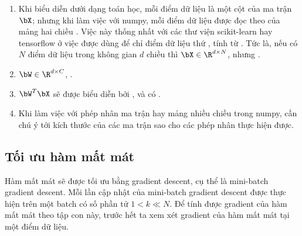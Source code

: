 \begin{mydeff}
\begin{enumerate}
\item Khi biểu diễn dưới dạng toán học, mỗi điểm dữ liệu là một cột của ma trận
$\bX$; nhưng khi làm việc với numpy, mỗi điểm dữ liệu được đọc theo
 của mảng hai chiều .
Việc này
thống nhất với các thư viện scikit-learn hay tensorflow ở việc
 được dùng để chỉ điểm dữ liệu thứ , tính
từ . Tức là, nếu có $N$ điểm dữ liệu trong không gian $d$
chiều thì $\bX \in \R^{d \times N}$, nhưng .

\item $\bW \in \R^{d\times C}$, .

\item $\bW^T\bX$ sẽ được biểu diễn bởi , và có
.

\item Khi làm việc với phép nhân ma trận hay mảng nhiều chiều trong numpy,
cần chú ý tới kích thước của các ma trận sao cho các phép nhân thực
hiện được.

\end{enumerate}

\end{mydeff}


\subsection{Tối ưu hàm mất mát }


Hàm mất mát sẽ được tối ưu bằng gradient descent, cụ thể là mini-batch
gradient descent.
Mỗi lần cập nhật của mini-batch gradient descent được thực hiện trên một
{batch} có số phần tử $1 < k \ll N$. Để tính được gradient của hàm mất
mát theo tập con này, trước hết ta xem xét gradient của hàm mất mát tại một điểm
dữ liệu.

